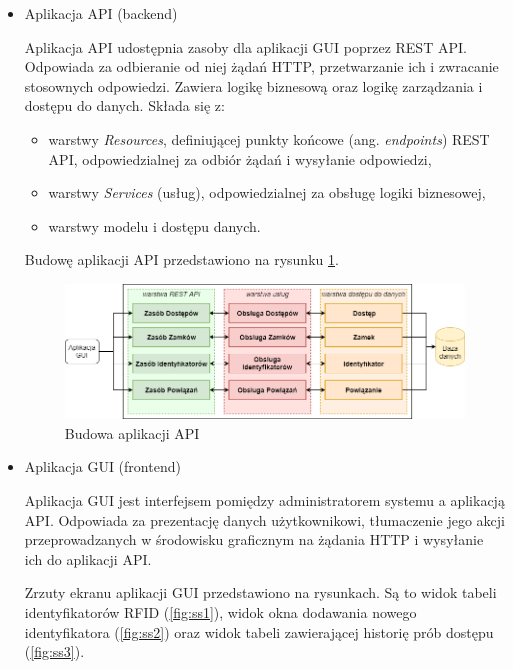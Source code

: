     	\begin{itemize}
    		\item Aplikacja API (backend)

    			Aplikacja API udostępnia zasoby dla aplikacji GUI poprzez REST API. Odpowiada za odbieranie od niej żądań HTTP, przetwarzanie ich i zwracanie stosownych odpowiedzi. Zawiera logikę biznesową oraz logikę zarządzania i dostępu do danych. Składa się z:

    			\begin{itemize}
    				\item warstwy \textit{Resources}, definiującej punkty końcowe (ang. \textit{endpoints}) REST API, odpowiedzialnej za odbiór żądań i wysyłanie odpowiedzi,
    				\item warstwy \textit{Services} (usług), odpowiedzialnej za obsługę logiki biznesowej,
    				\item warstwy modelu i dostępu danych.
    			\end{itemize}

    			Budowę aplikacji API przedstawiono na rysunku \ref{fig:api}.

    			\vspace{10mm}
    			\begin{figure}[h!]
	            	\centering
		            \includegraphics[width=\textwidth]{chapters/images/uslugi2.png}
		            \caption{Budowa aplikacji API}
		            \label{fig:api}
		        \end{figure}
		        \vspace{10mm}

		    \item Aplikacja GUI (frontend)

				Aplikacja GUI jest interfejsem pomiędzy administratorem systemu a aplikacją API. Odpowiada za prezentację danych użytkownikowi, tłumaczenie jego akcji przeprowadzanych w środowisku graficznym na żądania HTTP i wysyłanie ich do aplikacji API.

				Zrzuty ekranu aplikacji GUI przedstawiono na rysunkach. Są to widok tabeli identyfikatorów RFID (\ref{fig:ss1}), widok okna dodawania nowego identyfikatora (\ref{fig:ss2}) oraz widok tabeli zawierającej historię prób dostępu (\ref{fig:ss3}).



\end{itemize}
